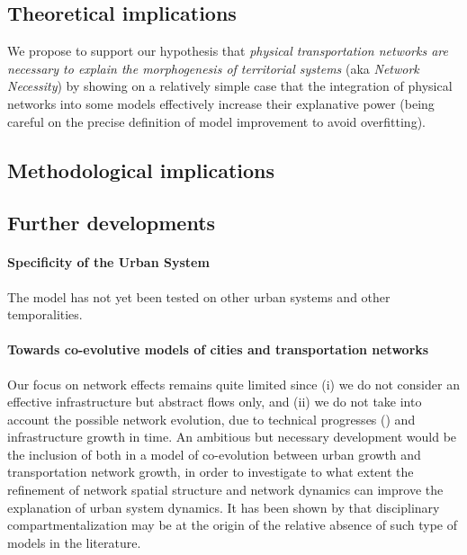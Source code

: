 \documentclass[Royal,sageh,times]{sagej}
\begin{document}
\subsection*{Theoretical implications}


We propose to support our hypothesis that \textit{physical transportation networks are necessary to explain the morphogenesis of territorial systems} (aka \textit{Network Necessity}) by showing on a relatively simple case that the integration of physical networks into some models effectively increase their explanative power (being careful on the precise definition of model improvement to avoid overfitting).





\subsection*{Methodological implications}





\subsection*{Further developments}


\paragraph{Specificity of the Urban System}

The model has not yet been tested on other urban systems and other temporalities.



\paragraph{Towards co-evolutive models of cities and transportation networks}

Our focus on network effects remains quite limited since (i) we do not consider an effective infrastructure but abstract flows only, and (ii) we do not take into account the possible network evolution, due to technical progresses (\cite{bretagnolle2000long}) and infrastructure growth in time. An ambitious but necessary development would be the inclusion of both in a model of co-evolution between urban growth and transportation network growth, in order to investigate to what extent the refinement of network spatial structure and network dynamics can improve the explanation of urban system dynamics. It has been shown by \cite{raimbault2016models} that disciplinary compartmentalization may be at the origin of the relative absence of such type of models in the literature.
\end{document}
